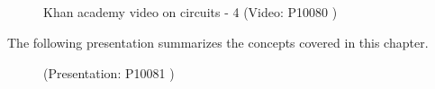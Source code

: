             \subsection{ }
            \nopagebreak
    \setcounter{subfigure}{0}
	\begin{figure}[H] %
    \textnormal{Khan academy video on circuits - 4}\vspace{.1in} \nopagebreak
  \label{m38776*yt-media4}\label{m38776*yt-video4}
             { (Video:  P10080 )}
      \vspace{2pt}
    \vspace{.1in}
 \end{figure}       
    \label{m38776*eip-872}The following presentation summarizes the concepts covered in this chapter. 
    \setcounter{subfigure}{0}
	\begin{figure}[H] %
        \label{m38776*slidesharemedia}\label{m38776*slideshareflash} { (Presentation:  P10081 )}
      \vspace{2pt}
    \vspace{.1in}
 \end{figure}       
    \label{m38776*cid7}
